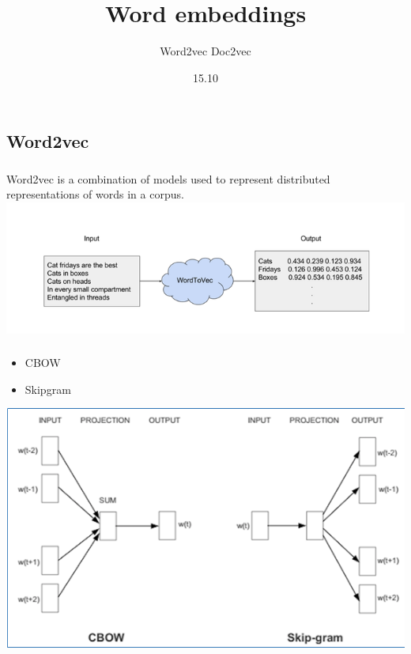 \documentclass[t, 11pt]{beamer}
\title{Word embeddings}
\subtitle{Word2vec Doc2vec}
\date{15.10}
\institute{<<Высшая школа экономики>>}
\begin{document}
	\frame[plain]{\titlepage}
%	
%			 
%	

\subsection{Word2vec}
\begin{frame}
	\frametitle{\insertsection}
	\frametitle{\insertsubsection}  
	Word2vec is a combination of models used to represent distributed representations of words in a corpus.
	\includegraphics[width=1\linewidth]{word2vec.png} 
\end{frame}


\begin{frame}
	\frametitle{\insertsection}
	\frametitle{\insertsubsection}  
	\begin{itemize}
		\item CBOW
		\item Skipgram
	\end{itemize}
	\includegraphics[width=0.8\linewidth]{cbow_skipgram.png} 
\end{frame}
\end{document}
